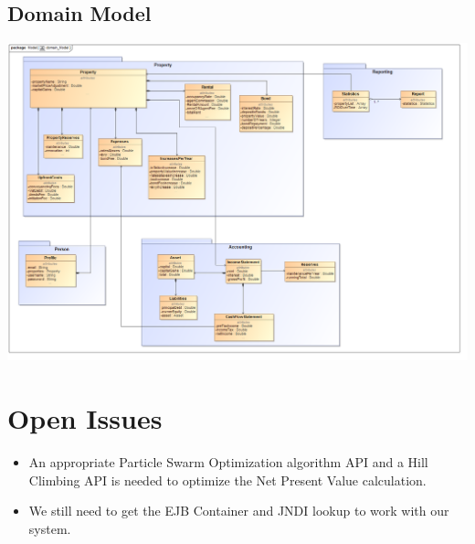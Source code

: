 \documentclass[a4paper,12pt]{article}
\begin{document}
\subsection{Domain Model}
\includegraphics[width=1\textwidth]{./domainModel/domain_Model.PNG}


\newpage
\section{Open Issues}
\begin{itemize}
	\item An appropriate Particle Swarm Optimization algorithm API and a Hill Climbing API is needed to optimize the Net Present Value calculation. 
	\item We still need to get the EJB Container and JNDI lookup to work with our system.
\end{itemize}
\end{document}

